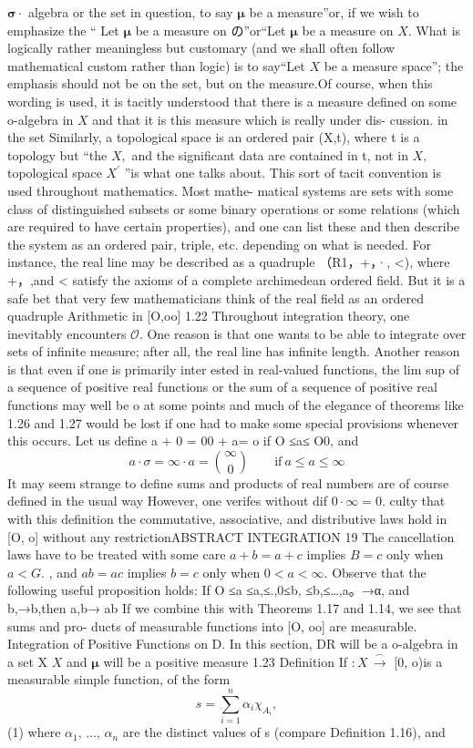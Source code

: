 ${\boldsymbol{\sigma}}\cdot$ algebra or the set in question, to say $\boldsymbol{\mu}$ be a measure”or, if we wish to emphasize the “ Let ${\boldsymbol{\mu}}$ be a measure on の”or“Let ${\boldsymbol{\mu}}$ be a measure on $X.$ What is logically rather meaningless but customary (and we shall often follow mathematical custom rather than logic) is to say“Let $X$ be a measure space”; the emphasis should not be on the set, but on the measure.Of course, when this wording is used, it is tacitly understood that there is a measure defined on some o-algebra in $X$ and that it is this measure which is really under dis- cussion. in the set Similarly, a topological space is an ordered pair (X,t), where t is a topology but “the $X,$ and the significant data are contained in t, not in $X,$ topological space $X^{\prime}$ ”is what one talks about. This sort of tacit convention is used throughout mathematics. Most mathe- matical systems are sets with some class of distinguished subsets or some binary operations or some relations (which are required to have certain properties), and one can list these and then describe the system as an ordered pair, triple, etc. depending on what is needed. For instance, the real line may be described as a quadruple （R1，+，·, <), where +，,and < satisfy the axioms of a complete archimedean ordered field. But it is a safe bet that very few mathematicians think of the real field as an ordered quadruple Arithmetic in [O,oo] 1.22 Throughout integration theory, one inevitably encounters ${\mathcal{O}}.$ One reason is that one wants to be able to integrate over sets of infinite measure; after all, the real line has infinite length. Another reason is that even if one is primarily inter ested in real-valued functions, the lim sup of a sequence of positive real functions or the sum of a sequence of positive real functions may well be o at some points and much of the elegance of theorems like 1.26 and 1.27 would be lost if one had to make some special provisions whenever this occurs. Let us define a + 0 = 00 + a= o if O ≤a≤ O0, and $$ a\cdot\sigma=\infty\cdot a={\binom{\infty}{0}}\qquad{\mathrm{if~}}a\leq a\leq\infty $$ It may seem strange to define sums and products of real numbers are of course defined in the usual way However, one verifes without dif $0\cdot\infty=0.$ culty that with this definition the commutative, associative, and distributive laws hold in [O, o] without any restrictionABSTRACT INTEGRATION 19 The cancellation laws have to be treated with some care $a+b=a+c$ implies $\scriptstyle{B=c}$ only when $a<G.$ , and $a b=a c$ implies $b=c$ only when $0<a<\infty.$ Observe that the following useful proposition holds: If O ≤a ≤a,≤.,0≤b, ≤b,≤…,a。→α, and b,→b,then a,b→ ab If we combine this with Theorems 1.17 and 1.14, we see that sums and pro- ducts of measurable functions into [O, oo] are measurable. Integration of Positive Functions on D. In this section, DR will be a o-algebra in a set X $X$ and ${\boldsymbol{\mu}}$ will be a positive measure 1.23 Definition If $\scriptstyle:X\,{\overset{\frown}{\to}}$ [0, o)is a measurable simple function, of the form $$ s=\sum_{i=1}^{n}\alpha_{i}\chi_{A_{i}}, $$ (1) where $\alpha_{1},\,\dots,\,\alpha_{n}$ are the distinct values of s (compare Definition 1.16), and 